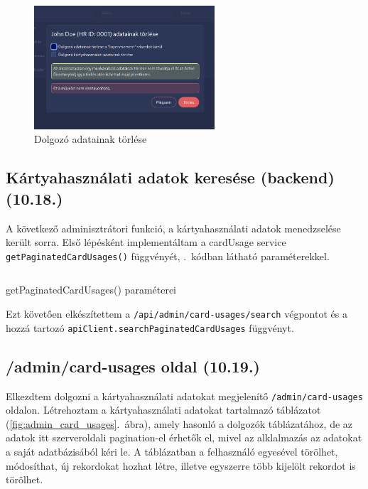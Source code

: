 \documentclass[a4paper]{article}
\newcommand{\inltxt}[1]{\texttt{#1}}
\begin{document}
\begin{figure}[ht]
  \centering
  \includegraphics[width = 0.6\textwidth]{images/delete_employee.png}
  \caption{Dolgozó adatainak törlése}
  \label{fig:delete_employee}
\end{figure}

\subsection{Kártyahasználati adatok keresése (backend) (10.18.)}

A következő adminisztrátori funkció, a kártyahasználati adatok menedzselése került sorra. Első
lépésként implementáltam a cardUsage service \inltxt{getPaginatedCardUsages()} függvényét,
.~kódban látható paraméterekkel.

\begin{listing}[!ht]
\inputminted[bgcolor=codebg, breaklines, breakanywhere, fontsize=\small]{typescript}{code/cardUsageSearchParams.ts}
\caption{getPaginatedCardUsages() paraméterei}
\label{listing:card_usage_search_params}
\end{listing}

Ezt követően elkészítettem a \inltxt{/api/admin/card-usages/search} végpontot és a hozzá tartozó
\inltxt{apiClient.searchPaginatedCardUsages} függvényt.

\subsection{/admin/card-usages oldal (10.19.)}

Elkezdtem dolgozni a kártyahasználati adatokat megjelenítő \inltxt{/admin/card-usages} oldalon.
Létrehoztam a kártyahasználati adatokat tartalmazó táblázatot (\ref{fig:admin_card_usages}.~ábra), amely hasonló a dolgozók
táblázatához, de az adatok itt szerveroldali pagination-el érhetők el, mivel az alklalmazás az adatokat
a saját adatbázisából kéri le. A táblázatban a felhasználó egyesével törölhet, módosíthat, új rekordokat
hozhat létre, illetve egyszerre több kijelölt rekordot is törölhet.
\end{document}
